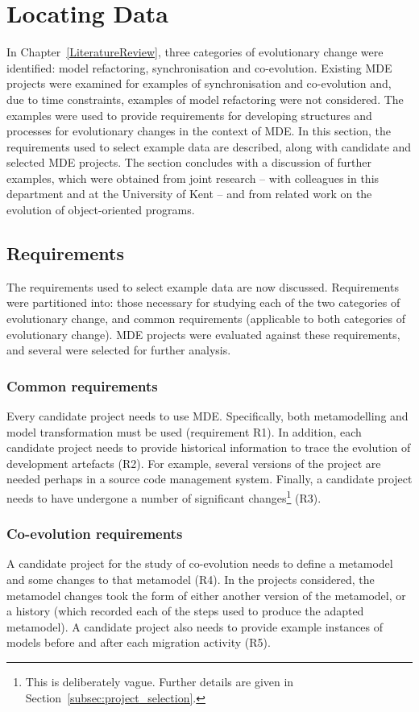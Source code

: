 \section{Locating Data}
\label{sec:locating_data}
In Chapter~\ref{LiteratureReview}, three categories of evolutionary change were identified: model refactoring, synchronisation and co-evolution. Existing MDE projects were examined for examples of synchronisation and co-evolution and, due to time constraints, examples of model refactoring were not considered. The examples were used to provide requirements for developing structures and processes for evolutionary changes in the context of MDE. In this section, the requirements used to select example data are described, along with candidate and selected MDE projects. The section concludes with a discussion of further examples, which were obtained from joint research -- with colleagues in this department and at the University of Kent -- and from related work on the evolution of object-oriented programs.  

\subsection{Requirements}
The requirements used to select example data are now discussed. Requirements were partitioned into: those necessary for studying each of the two categories of evolutionary change, and common requirements (applicable to both categories of evolutionary change). MDE projects were evaluated against these requirements, and several were selected for further analysis.

\subsubsection{Common requirements}
Every candidate project needs to use MDE. Specifically, both metamodelling and model transformation must be used (requirement R1). In addition, each candidate project needs to provide historical information to trace the evolution of development artefacts (R2). For example, several versions of the project are needed perhaps in a source code management system. Finally, a candidate project needs to have undergone a number of significant changes\footnote{This is deliberately vague. Further details are given in Section~\ref{subsec:project_selection}.} (R3).

\subsubsection{Co-evolution requirements}
A candidate project for the study of co-evolution needs to define a metamodel and some changes to that metamodel (R4). In the projects considered, the metamodel changes took the form of either another version of the metamodel, or a history (which recorded each of the steps used to produce the adapted metamodel). A candidate project also needs to provide example instances of models before and after each migration activity (R5).

